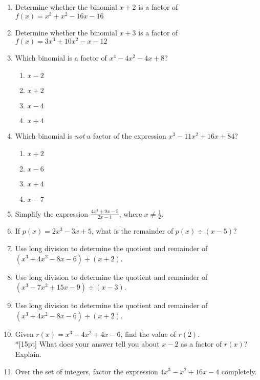 \documentclass[12pt, oneside]{article}
\begin{document}
\begin{enumerate}
\item Determine whether the binomial $x+2$ is a factor of $f(x)=x^3+x^2-16x-16$
\item Determine whether the binomial $x+3$ is a factor of $f(x)=3x^3+10x^2-x-12$

\item Which binomial is a factor of $x^4-4x^2-4x+8$?
\begin{enumerate}
    \item $x-2$
    \item $x+2$
    \item $x-4$
    \item $x+4$
\end{enumerate} %


\item Which binomial is \emph{not} a factor of the expression $x^3- 11x^2 +16x +84$?
\begin{enumerate}
    \item $x+2$
    \item $x-6$
    \item $x+4$
    \item $x-7$
\end{enumerate}

\item Simplify the expression $\displaystyle \frac{4x^3+9x-5}{2x-1}$, where $x \neq \frac{1}{2}$. %

\item If $p(x)=2x^3-3x+5$, what is the remainder of $p(x) \div (x-5)$? %

\item Use long division to determine the quotient and remainder of $(x^3+4x^2-8x-6) \div (x+2)$.
\item Use long division to determine the quotient and remainder of $(x^3-7x^2+15x-9) \div (x-3)$.
\item Use long division to determine the quotient and remainder of $(x^3+4x^2-8x-6) \div (x+2)$.

\item Given $r(x)=x^3-4x^2+4x-6$, find the value of $r(2)$.\\*[15pt]
What does your answer tell you about $x-2$ as a factor of $r(x)$? Explain. %

\item Over the set of integers, factor the expression $4x^3-x^2  +16x-4$ completely.
 

\end{enumerate}
\end{document}
